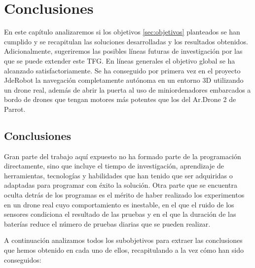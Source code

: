 \chapter{Conclusiones}\label{cap.conclusiones}

En este capítulo analizaremos si los objetivos \ref{sec:objetivos} planteados se han cumplido y se recapitulan las soluciones desarrolladas y los resultados obtenidos. Adicionalmente, sugeriremos las posibles líneas futuras de investigación por las que se puede extender este TFG. En líneas generales el objetivo global se ha alcanzado satisfactoriamente. Se ha conseguido por primera vez en el proyecto JdeRobot la navegación completamente autónoma en un entorno 3D utilizando un drone real, además de abrir la puerta al uso de miniordenadores embarcados a bordo de drones que tengan motores más potentes que los del Ar.Drone 2 de Parrot.

\section{Conclusiones}

Gran parte del trabajo aquí expuesto no ha formado parte de la programación directamente, sino que incluye el tiempo de investigación, aprendizaje de herramientas, tecnologías y habilidades que han tenido que ser adquiridas o adaptadas para programar con éxito la solución. Otra parte que se encuentra oculta detrás de los programas es el mérito de haber realizado los experimentos en un drone real cuyo comportamiento es inestable, en el que el ruido de los sensores condiciona el resultado de las pruebas y en el que la duración de las baterías reduce el número de pruebas diarias que se pueden realizar.

A continuación analizamos todos los subobjetivos para extraer las conclusiones que hemos obtenido en cada uno de ellos, recapitulando a la vez cómo han sido conseguidos:

